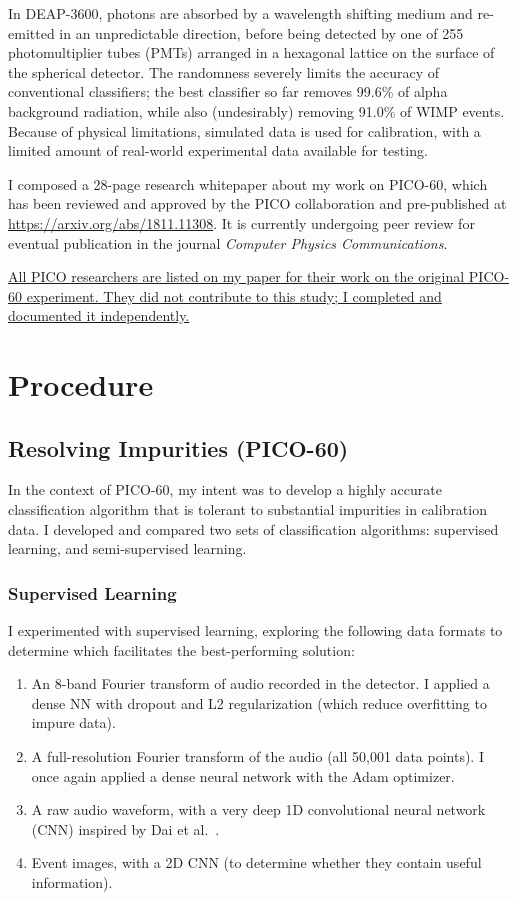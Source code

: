 \documentclass[12pt]{article}
\begin{document}
In DEAP-3600, photons are absorbed by a wavelength shifting medium and re-emitted in an unpredictable direction, before being detected by one of 255 photomultiplier tubes (PMTs) arranged in a hexagonal lattice on the surface of the spherical detector. The randomness severely limits the accuracy of conventional classifiers; the best classifier so far removes 99.6\% of alpha background radiation, while also (undesirably) removing 91.0\% of WIMP events. Because of physical limitations, simulated data is used for calibration, with a limited amount of real-world experimental data available for testing.

I composed a 28-page research whitepaper \cite{me} about my work on PICO-60, which has been reviewed and approved by the PICO collaboration and pre-published at \url{https://arxiv.org/abs/1811.11308}. It is currently undergoing peer review for eventual publication in the journal \textit{Computer Physics Communications}.

\ul{All PICO researchers are listed on my paper for their work on the original PICO-60 experiment. They did not contribute to this study; I completed and documented it independently.}

\section{Procedure}

\subsection{Resolving Impurities (PICO-60)}

In the context of PICO-60, my intent was to develop a highly accurate classification algorithm that is tolerant to substantial impurities in calibration data. I developed and compared two sets of classification algorithms: supervised learning, and semi-supervised learning.

\subsubsection{Supervised Learning}

I experimented with supervised learning, exploring the following data formats to determine which facilitates the best-performing solution:

\begin{enumerate}
    \item An 8-band Fourier transform of audio recorded in the detector. I applied a dense NN with dropout \cite{dropout} and L2 regularization (which reduce overfitting to impure data).
    \item A full-resolution Fourier transform of the audio (all 50,001 data points). I once again applied a dense neural network with the Adam \cite{adam} optimizer.
    \item A raw audio waveform, with a very deep 1D convolutional neural network (CNN) inspired by Dai et al.\ \cite{verydeepconvnets}.
    \item Event images, with a 2D CNN (to determine whether they contain useful information).
\end{enumerate}
\end{document}
